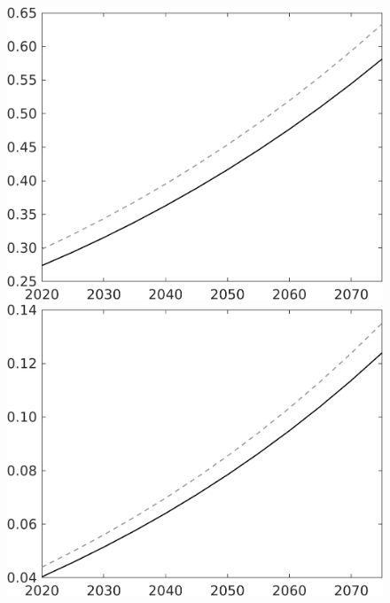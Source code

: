 \documentclass[12pt]{article}
\begin{document}
\begin{figure}[h!!]
\begin{minipage}[]{0.32\textwidth}
	\end{minipage}	
	\begin{minipage}[]{0.32\textwidth}
		\includegraphics[width=1\textwidth]{../../codding_model/own_basedOnFried/optimalPol_010922_revision/figures/all_13Sept22/CompTaul_LFBAU_Reg0_F_spillover0_nsk1_xgr0_knspil0_sep1_countec0_GovRev0_etaa0.79_lgd0.png}
	\end{minipage}	
	\begin{minipage}[]{0.32\textwidth}
		\includegraphics[width=1\textwidth]{../../codding_model/own_basedOnFried/optimalPol_010922_revision/figures/all_13Sept22/CompTaul_LFBAU_Reg0_G_spillover0_nsk1_xgr0_knspil0_sep1_countec0_GovRev0_etaa0.79_lgd0.png}

\end{minipage}
\end{figure}
\end{document}
